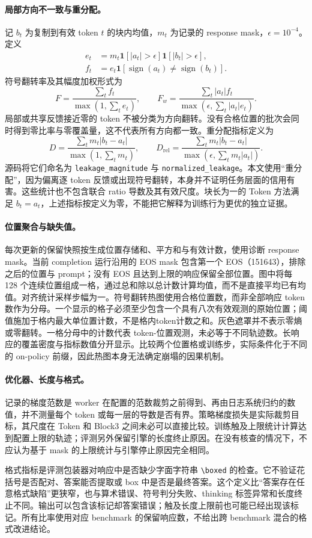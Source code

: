 \paragraph{局部方向不一致与重分配。}
记 $b_t$ 为复制到有效 token $t$ 的块内均值，$m_t$ 为记录的 response mask，$\epsilon=10^{-4}$。定义
\begin{align}
 e_t&=m_t\mathbf1[|a_t|>\epsilon]\mathbf1[|b_t|>\epsilon],\\
 f_t&=e_t\mathbf1[\operatorname{sign}(a_t)\ne\operatorname{sign}(b_t)].
\end{align}
符号翻转率及其幅度加权形式为
\begin{equation}
 F=\frac{\sum_t f_t}{\max(1,\sum_t e_t)},\qquad
 F_w=\frac{\sum_t |a_t|f_t}{\max(\epsilon,\sum_t |a_t|e_t)}.
\end{equation}
局部或共享反馈接近零的 token 不被分类为方向翻转。没有合格位置的批次会同时得到零比率与零覆盖量，这不代表所有方向都一致。重分配指标定义为
\begin{equation}
 D=\frac{\sum_t m_t|b_t-a_t|}{\max(1,\sum_t m_t)},\qquad
 D_{\mathrm{rel}}=\frac{\sum_t m_t|b_t-a_t|}{\max(\epsilon,\sum_t m_t|a_t|)}.
\end{equation}
源码将它们命名为 \texttt{leakage\_magnitude} 与 \texttt{normalized\_leakage}。本文使用“重分配”，因为偏离逐 token 反馈或出现符号翻转，本身并不证明任务层面的信用有害。这些统计也不包含联合 ratio 导数及其有效尺度。块长为一的 Token 方法满足 $b_t=a_t$，上述指标按定义为零，不能把它解释为训练行为更优的独立证据。

\paragraph{位置聚合与缺失值。}
每次更新的保留快照按生成位置存储和、平方和与有效计数，使用诊断 response mask。当前 completion 运行沿用的 EOS mask 包含第一个 EOS（151643），排除之后的位置与 prompt；没有 EOS 且达到上限的响应保留全部位置。图中将每 128 个连续位置组成一格，通过总和除以总计数计算均值，而不是直接平均已有均值。对齐统计采样步幅为一。符号翻转热图使用合格位置数，而非全部响应 token 数作为分母。一个显示的格子必须至少包含一个具有八次有效观测的原始位置；阈值施加于格内最大单位置计数，不是格内token计数之和。灰色遮罩并不表示零熵或零翻转。一格分母中的计数代表 token-位置观测，未必等于不同轨迹数。长响应的覆盖密度与指标数值分开显示。比较两个位置格或训练步，实际条件化于不同的 on-policy 前缀，因此热图本身无法确定崩塌的因果机制。

\paragraph{优化器、长度与格式。}
记录的梯度范数是 worker 在配置的范数裁剪之前得到、再由日志系统归约的数值，并不测量每个 token 或每一层的导数是否有界。策略梯度损失是实际裁剪目标，其尺度在 Token 和 Block3 之间未必可以直接比较。训练触及上限统计计算达到配置上限的轨迹；评测另外保留引擎的长度终止原因。在没有核查的情况下，不应认为基于 mask 的上限统计与引擎停止原因完全相同。

格式指标是评测包装器对响应中是否缺少字面字符串 \verb|\boxed| 的检查。它不验证花括号是否配对、答案能否提取或 box 中是否是最终答案。这个定义比“答案存在任意格式缺陷”更狭窄，也与算术错误、符号判分失败、thinking 标签异常和长度终止不同。输出可以包含该标记却答案错误；触及长度上限前也可能已经出现该标记。所有比率使用对应 benchmark 的保留响应数，不给出跨 benchmark 混合的格式改进结论。
